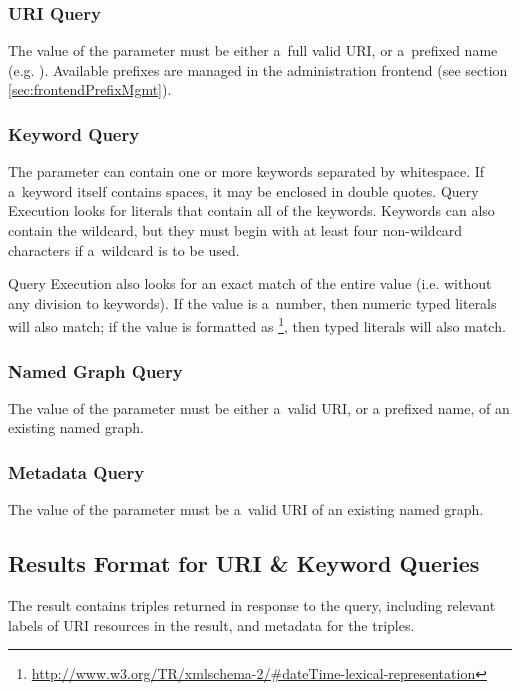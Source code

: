 \subsubsection{URI Query}
The value of the  parameter must be either a~full valid URI, or a~prefixed name (e.g. ).  Available prefixes are managed in the administration frontend (see section \ref{sec:frontendPrefixMgmt}).

\subsubsection{Keyword Query}
The  parameter can contain one or more keywords separated by whitespace. If a~keyword itself contains spaces, it may be enclosed in double quotes. Query Execution looks for literals that contain all of the keywords. Keywords can also contain the \code{*} wildcard, but they must begin with at least four non-wildcard characters if a~wildcard is to be used.

Query Execution also looks for an exact match of the entire  value (i.e. without any division to keywords). If the  value is a~number, then numeric typed literals will also match; if the  value is formatted as \footnote{\url{http://www.w3.org/TR/xmlschema-2/\#dateTime-lexical-representation}}, then  typed literals will also match.

\subsubsection{Named Graph Query}
The value of the  parameter must be either a~valid URI, or a prefixed name, of an existing named graph.

\subsubsection{Metadata Query}
The value of the  parameter must be a~valid URI of an existing named graph.

\subsection{Results Format for URI \& Keyword Queries}
\label{sec:URIKWResultsFormat}

The result contains triples returned in response to the query, including relevant labels of URI resources in the result, and metadata for the triples.

